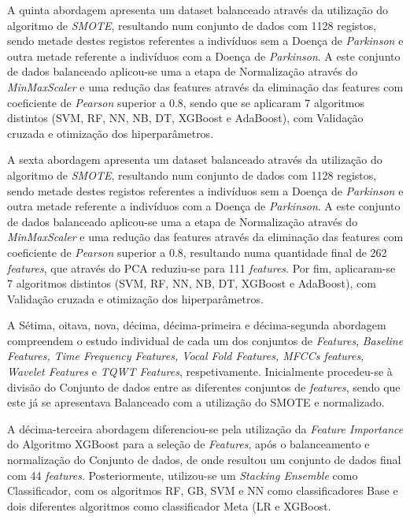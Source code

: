 \documentclass[12pt,a4paper,twoside]{report}
\begin{document}
{A quinta abordagem apresenta um dataset balanceado através da utilização do algoritmo de \textit{SMOTE}, resultando num conjunto de dados com 1128 registos, sendo metade destes registos referentes a indivíduos sem a Doença de \textit{Parkinson} e outra metade referente a indivíduos com a Doença de \textit{Parkinson}. A este conjunto de dados balanceado aplicou-se uma a etapa de Normalização através do \textit{MinMaxScaler} e uma redução das features através da eliminação das features com coeficiente de \textit{Pearson} superior a 0.8, sendo que se aplicaram 7 algoritmos distintos (\gls{SVM}, \Gls{RF}, \gls{NN}, \gls{NB}, \Gls{DT}, \Gls{XGBoost} e \gls{AdaBoost}), com Validação cruzada e otimização dos hiperparâmetros.

A sexta abordagem apresenta um dataset balanceado através da utilização do algoritmo de \textit{SMOTE}, resultando num conjunto de dados com 1128 registos, sendo metade destes registos referentes a indivíduos sem a Doença de \textit{Parkinson} e outra metade referente a indivíduos com a Doença de \textit{Parkinson}. A este conjunto de dados balanceado aplicou-se uma a etapa de Normalização através do \textit{MinMaxScaler} e uma redução das features através da eliminação das features com coeficiente de \textit{Pearson} superior a 0.8, resultando numa quantidade final de 262 \textit{features}, que através do \gls{PCA} reduziu-se para 111 \textit{features}. Por fim, aplicaram-se 7 algoritmos distintos (\gls{SVM}, \Gls{RF}, \gls{NN}, \gls{NB}, \Gls{DT}, \Gls{XGBoost} e \gls{AdaBoost}), com Validação cruzada e otimização dos hiperparâmetros.

A Sétima, oitava, nova, décima, décima-primeira e décima-segunda abordagem compreendem o estudo individual de cada um dos conjuntos de \textit{Features}, \textit{Baseline Features, Time Frequency Features, Vocal Fold Features, MFCCs features, Wavelet Features} e \textit{TQWT Features}, respetivamente. Inicialmente procedeu-se à divisão do Conjunto de dados entre as diferentes conjuntos de \textit{features}, sendo que este já se apresentava Balanceado com a utilização do \gls{SMOTE} e normalizado.

A décima-terceira abordagem diferenciou-se pela utilização da \textit{Feature Importance} do Algoritmo \gls{XGBoost} para a seleção de \textit{Features}, após o balanceamento e normalização do Conjunto de dados, de onde resultou um conjunto de dados final com 44 \textit{features}. Posteriormente, utilizou-se um \textit{Stacking Ensemble} como Classificador, com os algoritmos \gls{RF}, \Gls{GB}, \gls{SVM} e \gls{NN} como classificadores Base e dois diferentes algoritmos como classificador Meta (\gls{LR} e \gls{XGBoost}.

}
\end{document}
